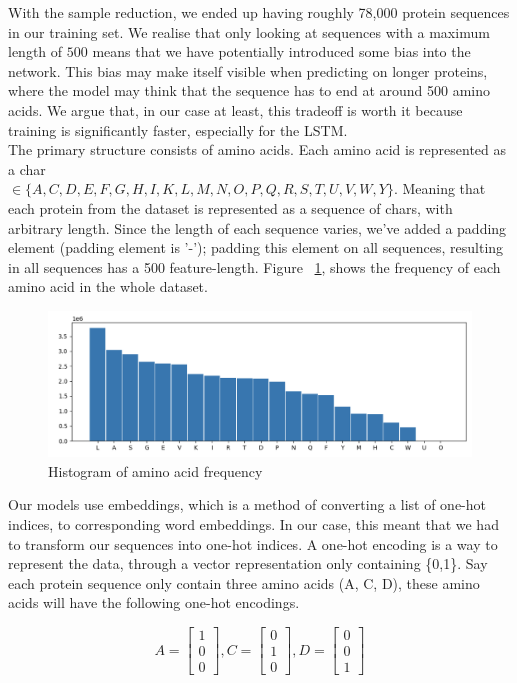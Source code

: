 \noindent
With the sample reduction, we ended up having roughly 78,000 protein sequences in our training set. We realise that only looking at sequences with a maximum length of $500$ means that we have potentially introduced some bias into the network. This bias may make itself visible when predicting on longer proteins, where the model may think that the sequence has to end at around 500 amino acids. We argue that, in our case at least, this tradeoff is worth it because training is significantly faster, especially for the LSTM.\\

\noindent
The primary structure consists of amino acids. Each amino acid is represented as a char \\ $\in \{A, C, D, E, F, G, H, I, K, L, M, N, O, P, Q, R, S, T, U, V, W, Y\}$. Meaning that each protein from the dataset is represented as a sequence of chars, with arbitrary length. Since the length of each sequence varies, we've added a padding element (padding element is '-'); padding this element on all sequences, resulting in all sequences has a 500 feature-length. Figure ~\ref{fig:before}, shows the frequency of each amino acid in the whole dataset.\\

\begin{figure}[!ht]
  \centering
  \includegraphics[scale=0.4]{latex/imgs/aminoFreq.png}
  \caption{Histogram of amino acid frequency}\label{fig:before}
\end{figure}

\noindent
Our models use embeddings, which is a method of converting a list of one-hot indices, to corresponding word embeddings. In our case, this meant that we had to transform our sequences into one-hot indices. A one-hot encoding is a way to represent the data, through a vector representation only containing \{0,1\}. Say each protein sequence only contain three amino acids (A, C, D), these amino acids will have the following one-hot encodings.

$$
A = \begin{bmatrix}
1 \\
0 \\
0
\end{bmatrix},
C = \begin{bmatrix}
0 \\
1 \\
0
\end{bmatrix},
D= \begin{bmatrix}
0 \\
0 \\
1
\end{bmatrix}
$$

